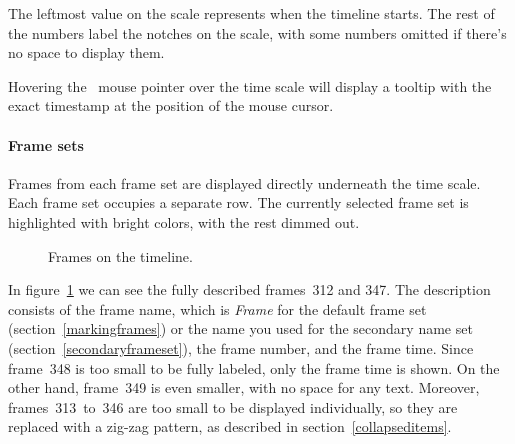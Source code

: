 \documentclass[hidelinks,titlepage,a4paper,twoside]{article}
\begin{document}
The leftmost value on the scale represents when the timeline starts. The rest of the numbers label the notches on the scale, with some numbers omitted if there's no space to display them.

Hovering the \faMousePointer{}~mouse pointer over the time scale will display a tooltip with the exact timestamp at the position of the mouse cursor.

\paragraph{Frame sets}
\label{framesets}

Frames from each frame set are displayed directly underneath the time scale. Each frame set occupies a separate row. The currently selected frame set is highlighted with bright colors, with the rest dimmed out.

\begin{figure}[h]
\centering{}
\caption{Frames on the timeline.}
\label{framesetsfig}
\end{figure}

In figure~\ref{framesetsfig} we can see the fully described frames~312 and 347. The description consists of the frame name, which is \emph{Frame} for the default frame set (section~\ref{markingframes}) or the name you used for the secondary name set (section~\ref{secondaryframeset}), the frame number, and the frame time. Since frame~348 is too small to be fully labeled, only the frame time is shown. On the other hand, frame~349 is even smaller, with no space for any text. Moreover, frames~313~to~346 are too small to be displayed individually, so they are replaced with a zig-zag pattern, as described in section~\ref{collapseditems}.
\end{document}
